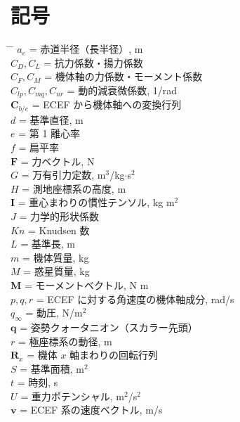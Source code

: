 \documentclass[11pt,a4paper,dvipdfmx]{jsarticle}
\newcommand{\bv}{{\boldsymbol v}}
\newcommand{\bF}{{\boldsymbol F}}
\newcommand{\bM}{{\boldsymbol M}}
\newcommand{\bI}{{\boldsymbol I}}
\newcommand{\bq}{{\boldsymbol q}}
\newcommand{\bC}{{\boldsymbol C}}
\newcommand{\bR}{{\boldsymbol R}}
\begin{document}
\section*{記号}
\begin{tabbing}
\hspace{7.0em}\= \hspace{1.5em} \= \hspace{10cm} \kill
	$a_e$      \> = \> 赤道半径（長半径）, m \\
	$C_D, C_L$ \> = \> 抗力係数・揚力係数 \\
	$C_{F}, C_{M}$ \> = \> 機体軸の力係数・モーメント係数 \\
	$C_{lp}, C_{mq}, C_{nr}$ \> = \> 動的減衰微係数, 1/rad \\
	$\bC_{b/e}$ \> = \> ECEF から機体軸への変換行列 \\
	$d$        \> = \> 基準直径, m \\
	$e$        \> = \> 第 1 離心率 \\
	$f$        \> = \> 扁平率 \\
	$\bF$      \> = \> 力ベクトル, N \\
	$G$        \> = \> 万有引力定数, m$^3$/kg$\cdot$s$^2$ \\
	$H$        \> = \> 測地座標系の高度, m \\
	$\bI$      \> = \> 重心まわりの慣性テンソル, kg m$^2$ \\
	$J$        \> = \> 力学的形状係数 \\
	$Kn$       \> = \> Knudsen 数 \\
	$L$        \> = \> 基準長, m \\
	$m$        \> = \> 機体質量, kg \\
	$M$        \> = \> 惑星質量, kg \\
	$\bM$      \> = \> モーメントベクトル, N m \\
	$p, q, r$  \> = \> ECEF に対する角速度の機体軸成分, rad/s \\
	$q_{\infty}$ \> = \> 動圧, N/m$^2$ \\
	$\bq$      \> = \> 姿勢クォータニオン（スカラー先頭） \\
	$r$        \> = \> 極座標系の動径, m \\
	$\bR_x$    \> = \> 機体 $x$ 軸まわりの回転行列 \\
	$S$        \> = \> 基準面積, m$^2$ \\
	$t$        \> = \> 時刻, s \\
	$U$        \> = \> 重力ポテンシャル, m$^2$/s$^2$ \\
	$\bv$      \> = \> ECEF 系の速度ベクトル, m/s \\

\end{tabbing}
\end{document}
